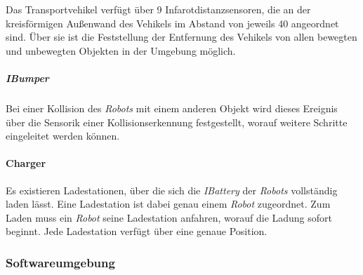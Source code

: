     Das Transportvehikel verfügt über 9 Infarotdistanzsensoren, die an der
    kreisförmigen Außenwand des Vehikels im Abstand von jeweils 40
    angeordnet sind. Über sie ist die Feststellung der Entfernung des
    Vehikels von allen bewegten und unbewegten Objekten in der Umgebung
    möglich.

    \subparagraph{IBumper}\label{ibumper}

    Bei einer Kollision des \emph{Robots} mit einem anderen Objekt wird
    dieses Ereignis über die Sensorik einer Kollisionserkennung festgestellt, worauf
    weitere Schritte eingeleitet werden können.

    \paragraph{Charger}\label{charger}

    Es existieren Ladestationen, über die sich die \emph{IBattery} der
    \emph{Robots} vollständig laden lässt. Eine Ladestation ist dabei genau
    einem \emph{Robot} zugeordnet. Zum Laden muss ein \emph{Robot} seine
    Ladestation anfahren, worauf die Ladung sofort beginnt. Jede Ladestation
    verfügt über eine genaue Position.

    \subsubsection{Softwareumgebung}

